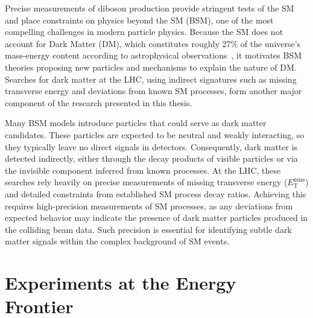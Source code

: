 Precise measurements of diboson production provide stringent tests of the SM and place constraints on physics beyond the SM (BSM), one of the most compelling challenges in modern particle physics. Because the SM does not account for Dark Matter (DM), which constitutes roughly 27\% of the universe's mass-energy content according to astrophysical observations~\cite{Bertone2005DMReview,Planck2018CosmoParams}, it motivates BSM theories proposing new particles and mechanisms to explain the nature of DM. Searches for dark matter at the LHC, using indirect signatures such as missing transverse energy and deviations from known SM processes, form another major component of the research presented in this thesis.

Many BSM models introduce particles that could serve as dark matter candidates. These particles are expected to be neutral and weakly interacting, so they typically leave no direct signals in detectors. Consequently, dark matter is detected indirectly, either through the decay products of visible particles or via the invisible component inferred from known processes. At the LHC, these searches rely heavily on precise measurements of missing transverse energy ($E_{\text{T}}^{\text{miss}}$) and detailed constraints from established SM process decay ratios.
%
Achieving this requires high-precision measurements of SM processes, as any deviations from expected behavior may indicate the presence of dark matter particles produced in the colliding beam data. Such precision is essential for identifying subtle dark matter signals within the complex background of SM events.

\section{Experiments at the Energy Frontier}

